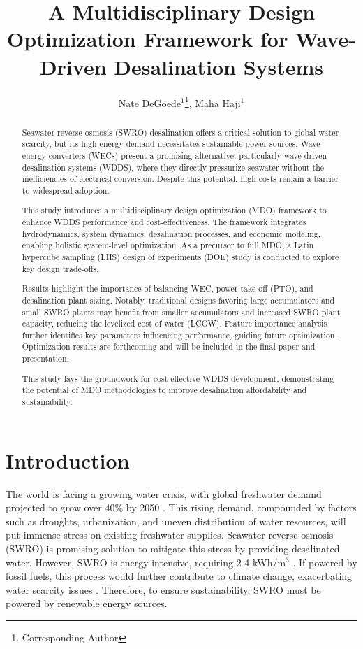 \documentclass[twocolumn,10pt]{asme2e}
\title{ \vspace{-10 mm} A Multidisciplinary Design Optimization Framework for Wave-Driven Desalination Systems}
\author{Nate DeGoede$^1$\thanks{Corresponding Author}, Maha Haji$^1$
    \affiliation{
	$^1$Sibley School of Mechanical and Aerospace Engineering\\
	Cornell University\\
	Ithaca, New York 14853\\
    Email: \{njd76, maha\}@cornell.edu 
    }
}
\begin{document}
\maketitle

\setlength{\abovedisplayskip}{10pt}
\setlength{\belowdisplayskip}{10pt}

\begin{abstract}

Seawater reverse osmosis (SWRO) desalination offers a critical solution to global water scarcity, but its high energy demand necessitates sustainable power sources. Wave energy converters (WECs) present a promising alternative, particularly wave-driven desalination systems (WDDS), where they directly pressurize seawater without the inefficiencies of electrical conversion. Despite this potential, high costs remain a barrier to widespread adoption. 

This study introduces a multidisciplinary design optimization (MDO) framework to enhance WDDS performance and cost-effectiveness. The framework integrates hydrodynamics, system dynamics, desalination processes, and economic modeling, enabling holistic system-level optimization.  As a precursor to full MDO, a Latin hypercube sampling (LHS) design of experiments (DOE) study is conducted to explore key design trade-offs. 

Results highlight the importance of balancing WEC, power take-off (PTO), and desalination plant sizing. Notably, traditional designs favoring large accumulators and small SWRO plants may benefit from smaller accumulators and increased SWRO plant capacity, reducing the levelized cost of water (LCOW). Feature importance analysis further identifies key parameters influencing performance, guiding future optimization. Optimization results are forthcoming and will be included in the final paper and presentation.

This study lays the groundwork for cost-effective WDDS development, demonstrating the potential of MDO methodologies to improve desalination affordability and sustainability.

\end{abstract}


\section{Introduction}

The world is facing a growing water crisis, with global freshwater demand projected to grow over 40\% by 2050 \cite{watershortage2015}. This rising demand, compounded by factors such as droughts, urbanization, and uneven distribution of water resources, will put immense stress on existing freshwater supplies. Seawater reverse osmosis (SWRO) is promising solution to mitigate this stress by providing desalinated water. However, SWRO is energy-intensive, requiring 2-4 kWh/m$^3$ \cite{Li2018}. If powered by fossil fuels, this process would further contribute to climate change, exacerbating water scarcity issues \cite{nytdrought}. Therefore, to ensure sustainability, SWRO must be powered by renewable energy sources. 
\end{document}
